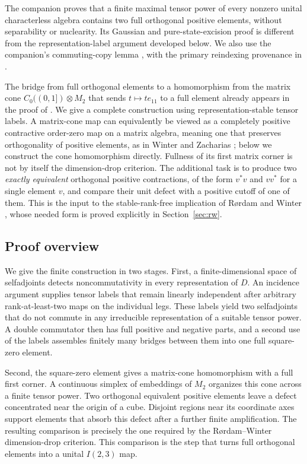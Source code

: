 The companion \cite[Theorem~1.4]{Fixed231} proves that a finite maximal tensor power
of every nonzero unital characterless algebra contains two full
orthogonal positive elements, without separability or nuclearity.
Its Gaussian and pure-state-excision proof is different from the
representation-label argument developed below. We also use the
companion's commuting-copy lemma \cite[Lemma~9.3]{Fixed231}, with the
primary reindexing provenance in
\cite[Proposition~2.2 and Corollary~2.3]{KR}.

The bridge from full orthogonal elements to a homomorphism from the matrix
cone $C_0((0,1])\otimes M_2$ that sends $t\mapsto t e_{11}$ to a full
element already appears in the proof of
\cite[Proposition~6.1]{KR}. We give a complete
construction using representation-stable tensor labels. A matrix-cone
map can equivalently be viewed as a completely positive contractive
order-zero map on a matrix algebra, meaning one that preserves
orthogonality of positive elements,
as in Winter and Zacharias \cite[Corollary~4.1]{WZ}; below we construct
the cone homomorphism directly. Fullness of its first matrix corner is
not by itself the dimension-drop criterion. The additional task is to
produce two \emph{exactly equivalent} orthogonal positive contractions,
of the form $v^*v$ and $vv^*$ for a single element $v$, and compare
their unit defect with a positive cutoff of one of them.
This is the input to the stable-rank-free implication of
R\o rdam and Winter \cite[Proposition~5.1, (ii)$\Rightarrow$(iv)]{RW},
whose needed form is proved explicitly in Section~\ref{sec:rw}.

\subsection{Proof overview}

We give the finite construction in two stages. First, a finite-dimensional
space of selfadjoints detects noncommutativity in every representation of
$D$. An incidence argument supplies tensor labels that remain linearly
independent after arbitrary rank-at-least-two maps on the individual legs.
These labels yield two selfadjoints that do not commute in any irreducible
representation of a suitable tensor power. A double commutator then has
full positive and negative parts, and a second use of the labels assembles
finitely many bridges between them into one full square-zero element.

Second, the square-zero element gives a matrix-cone homomorphism with a full
first corner. A
continuous simplex of embeddings of $M_2$ organizes this cone across a
finite tensor power. Two orthogonal equivalent positive elements leave a
defect concentrated near the origin of a cube. Disjoint regions near its
coordinate axes support elements that absorb this defect after a further
finite amplification. The resulting comparison is precisely the one
required by the R\o rdam--Winter dimension-drop criterion. This comparison
is the step that turns full orthogonal elements into a unital $I(2,3)$ map.

